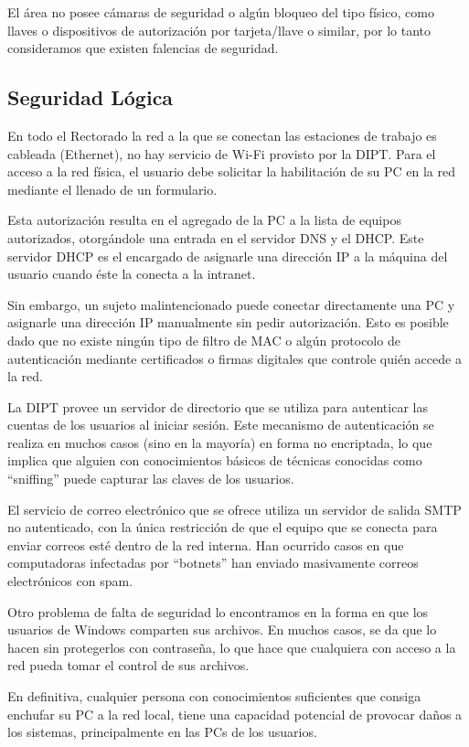 \documentclass[a4paper,11pt,oneside]{article}
\begin{document}
El área no posee cámaras de seguridad o algún bloqueo del tipo físico,
como llaves o dispositivos de autorización por tarjeta/llave o
similar, por lo tanto consideramos que existen falencias de seguridad.
%
\subsection*{Seguridad Lógica}
En todo el Rectorado la red a la que se conectan las estaciones de
trabajo es cableada (Ethernet), no hay servicio de Wi-Fi provisto por
la DIPT. Para el acceso a la red física, el usuario debe solicitar la
habilitación de su PC en la red mediante el llenado de un formulario.

Esta autorización resulta en el agregado de la PC a la lista de
equipos autorizados, otorgándole una entrada en el servidor DNS y el
DHCP. Este servidor DHCP es el encargado de asignarle una dirección IP
a la máquina del usuario cuando éste la conecta a la intranet.

Sin embargo, un sujeto malintencionado puede conectar directamente una
PC y asignarle una dirección IP manualmente sin pedir
autorización. Esto es posible dado que no existe ningún tipo de filtro
de MAC o algún protocolo de autenticación mediante certificados o
firmas digitales que controle quién accede a la red.

La DIPT provee un servidor de directorio  que se utiliza
para autenticar las cuentas de los usuarios al iniciar sesión. Este
mecanismo de autenticación se realiza en muchos casos (sino en la
mayoría) en forma no encriptada, lo que implica que alguien con
conocimientos básicos de técnicas conocidas como ``sniffing'' puede
capturar las claves de los usuarios.

El servicio de correo electrónico que se ofrece utiliza un servidor de
salida SMTP no autenticado, con la única restricción de que el equipo
que se conecta para enviar correos esté dentro de la red interna. Han
ocurrido casos en que computadoras infectadas por ``botnets'' han
enviado masivamente correos electrónicos con spam.

Otro problema de falta de seguridad lo encontramos en la forma en que
los usuarios de Windows comparten sus archivos. En muchos casos, se da
que lo hacen sin protegerlos con contraseña, lo que hace que
cualquiera con acceso a la red pueda tomar el control de sus archivos.

En definitiva, cualquier persona con conocimientos suficientes que
consiga enchufar su PC a la red local, tiene una capacidad
potencial de provocar daños a los sistemas, principalmente en las PCs
de los usuarios.
%
\end{document}
